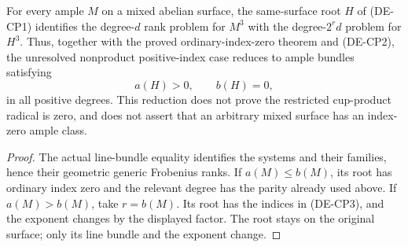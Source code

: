\begin{corollary}
\label{cor:DE-A3-mixed-primitive-rank-gate}
For every ample $M$ on a mixed abelian surface, the same-surface
root $H$ of (DE-CP1) identifies the degree-$d$ rank problem for
$M^3$ with the degree-$2^r d$ problem for $H^3$.
Thus, together with the proved ordinary-index-zero theorem and
(DE-CP2), the unresolved nonproduct positive-index case reduces to
ample bundles satisfying
\[
                         a(H)>0,\qquad b(H)=0,
                                                        \tag{DE-CP3}
\]
in all positive degrees.  This reduction does not prove the
restricted cup-product radical is zero, and does not assert that
an arbitrary mixed surface has an index-zero ample class.
\end{corollary}
\begin{proof}
The actual line-bundle equality identifies the systems and their
families, hence their geometric generic Frobenius ranks.  If
$a(M)\le b(M)$, its root has ordinary index zero and the relevant
degree has the parity already used above.  If $a(M)>b(M)$, take
$r=b(M)$.  Its root has the indices in (DE-CP3), and the exponent
changes by the displayed factor.  The root stays on the original
surface; only its line bundle and the exponent change.
\end{proof}
